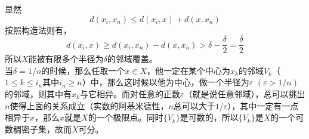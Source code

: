 \documentclass[11pt,a4paper,openany]{article} \usepackage{amssymb,amsfonts, amsmath,ctex,bm}
\begin{document}
\indent 显然
\[
d(x_i,x_n)\le d(x_i,x)+d(x,x_n)
\]
按照构造法则有，
\[
d(x_i,x)\ge d(x_i,x_n)-d(x,x_n)
>\delta-\frac{\delta}{2}=\frac{\delta}{2}
\]
所以$X$能被有限多个半径为$\delta$的邻域覆盖。\\\indent 当$\delta=1/n$的时候，那么任取一个$x\in X$，他一定在某个中心为$x_{k}$的邻域$V_{k}$（$1\le k \le i_n$其中$i_n\ge n$）中，那么这时候以他为中心，做一个半径为$\varepsilon$ $(\varepsilon>1/n)$的邻域，则其中有$x_k$与它相异。而对任意的正数$\varepsilon$（就是说任意邻域），总可以挑出$n$使得上面的关系成立（实数的阿基米德性，$n$总可以大于$1/\varepsilon$），其中一定有一点相异于$x$，那么$x$就是$X$的一个极限点。同时$\{V_k\}$是可数的，所以$\{V_k\}$是$X$的一个可数稠密子集，故而$X$可分。
\end{document}
